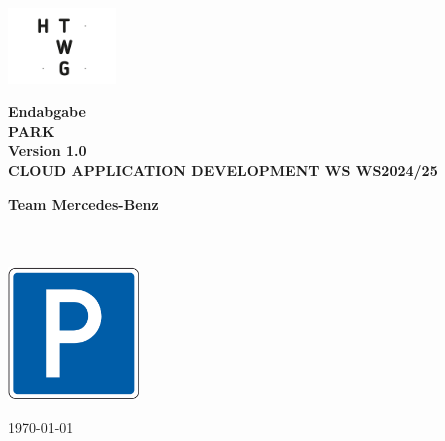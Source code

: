 \begin{titlepage}
    \begin{center}
        \vspace{0.5cm}
        
        \includegraphics[height=2cm]{resources/htwg-logo.png}
        
        \vspace{1.5cm}

        \Huge{\textbf{Endabgabe\\}}
        \vspace{0.5cm}
        \Huge{\textbf{PARK \\ Version 1.0 \\}}
        \vspace{0.5cm}
        \Huge{\textbf{CLOUD APPLICATION DEVELOPMENT WS WS2024/25}}
    
        \vspace{1.5cm}
 
        \Large{
            \textbf{Team Mercedes-Benz} \\
            \authorjonas \\
            \authorlukasb \\
            \authorlukase
        }
 
        \vspace{1.5cm}
        
        \includegraphics[height=3.5cm]{resources/logo.png}

        \vspace{1.5cm}

        \large{\today}
      
    \end{center}
 \end{titlepage}

\newpage
